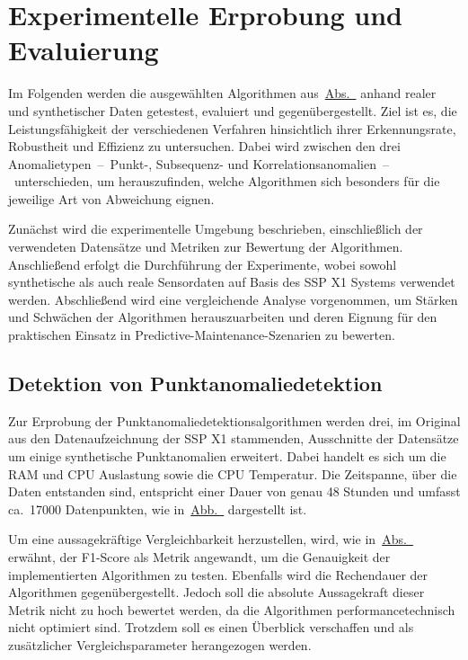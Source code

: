  \chapter{Experimentelle Erprobung und Evaluierung}\label{ch:anomaliedetektion_test}
Im Folgenden werden die ausgewählten Algorithmen aus~\hyperref[sec:algorithmen]{Abs.~} anhand realer und synthetischer
Daten getestest, evaluiert und gegenübergestellt. Ziel ist es, die Leistungsfähigkeit der verschiedenen Verfahren hinsichtlich ihrer
Erkennungsrate, Robustheit und Effizienz zu untersuchen. Dabei wird zwischen den drei Anomalietypen~–~Punkt-, Subsequenz- und
Korrelationsanomalien~–~unterschieden, um herauszufinden, welche Algorithmen sich besonders für die jeweilige Art von Abweichung eignen.

Zunächst wird die experimentelle Umgebung beschrieben, einschließlich der verwendeten Datensätze und Metriken zur Bewertung der Algorithmen.
Anschließend erfolgt die Durchführung der Experimente, wobei sowohl synthetische als auch reale Sensordaten auf Basis des SSP X1 Systems
verwendet werden. Abschließend wird eine vergleichende Analyse vorgenommen, um Stärken und Schwächen der Algorithmen herauszuarbeiten und
deren Eignung für den praktischen Einsatz in Predictive-Maintenance-Szenarien zu bewerten.

\section{Detektion von Punktanomaliedetektion}
Zur Erprobung der Punktanomaliedetektionsalgorithmen werden drei, im Original aus den Datenaufzeichnung der SSP X1 stammenden, Ausschnitte 
der Datensätze um einige synthetische Punktanomalien erweitert. Dabei handelt es sich um die RAM und CPU Auslastung sowie die CPU Temperatur.
Die Zeitspanne, über die Daten entstanden sind, entspricht einer Dauer von genau 48 Stunden und umfasst ca.~17000 Datenpunkten, wie
in~\hyperref[fig:punktanomalien_testdata]{Abb.~} dargestellt ist.

Um eine aussagekräftige Vergleichbarkeit herzustellen, wird, wie in~\hyperref[subsec:evaluation]{Abs.~} erwähnt, der
F1-Score als Metrik angewandt, um die Genauigkeit der implementierten Algorithmen zu testen. Ebenfalls wird die Rechendauer der
Algorithmen gegenübergestellt. Jedoch soll die absolute Aussagekraft dieser Metrik nicht zu hoch bewertet werden, da die Algorithmen
performancetechnisch nicht optimiert sind. Trotzdem soll es einen Überblick verschaffen und als zusätzlicher Vergleichsparameter
herangezogen werden.

